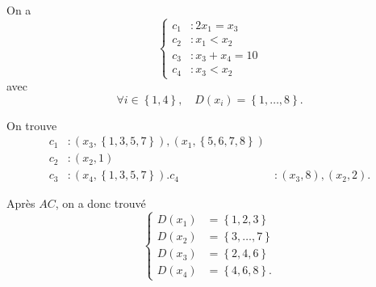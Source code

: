 \begin{td-exo}
    On a
    \begin{equation*}
        \begin{cases}
            c_1 &\colon 2x_1 = x_3 \\
            c_2 &\colon x_1 < x_2 \\
            c_3 &\colon x_3 + x_4 = 10 \\
            c_4 &\colon x_3 < x_2
        \end{cases}
    \end{equation*}
    avec
    \begin{equation*}
        \forall i \in \left\{1, 4\right\},\quad D(x_i) = \left\{1, \ldots, 8\right\}.
    \end{equation*}

    On trouve
    \begin{equation*}
        \begin{aligned}
            c_1 &\colon (x_3, \left\{1, 3, 5, 7\right\}), (x_1, \left\{5, 6, 7, 8\right\}) \\
            c_2 &\colon (x_2, 1) \\
            c_3 &\colon (x_4, \left\{1, 3, 5, 7\right\}).
            c_4 &\colon (x_3, 8), (x_2, 2).
        \end{aligned}
    \end{equation*}

    Après \(AC\), on a donc trouvé
    \begin{equation*}
        \begin{cases}
            D(x_1) &= \left\{1, 2, 3\right\} \\
            D(x_2) &= \left\{3, \ldots, 7\right\} \\
            D(x_3) &= \left\{2, 4, 6\right\} \\
            D(x_4) &= \left\{4, 6, 8\right\}.
        \end{cases}
    \end{equation*}
\end{td-exo}

